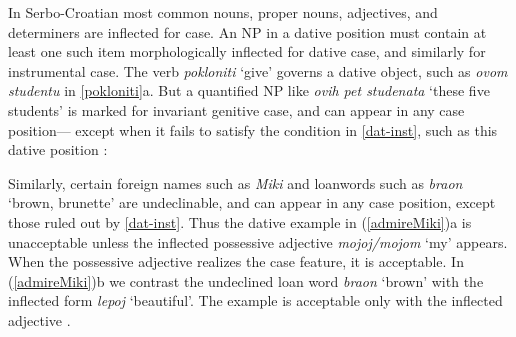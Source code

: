 In Serbo-Croatian most common nouns, proper nouns, adjectives, and determiners are inflected for case.  An NP in a dative position must contain at least one such item morphologically inflected for dative case, and similarly for instrumental case.  The verb {\it pokloniti} `give' governs a dative object, such as \textit{ovom  studentu} in \ref{pokloniti}a.  But a quantified NP like \textit{ovih pet studenata} `these five students' is marked for invariant genitive case, and can appear in any case position--- except when it fails to satisfy the condition in \ref{dat-inst}, such as this dative position \citep[p. 125]{WZ2003a}:

\begin{exe} 
\ex	\label{pokloniti}
\begin{xlist}
\end{xlist}
\end{exe}

\noindent
Similarly, certain foreign names such as \textit{Miki} and loanwords such as {\it braon} `brown, brunette' are undeclinable, and can appear in any case position, except those ruled out by \ref{dat-inst}.  Thus the
dative example in (\ref{admireMiki})a is unacceptable unless the inflected possessive
adjective {\it mojoj/mojom} `my'  appears.   When the possessive adjective realizes the case
feature, it is acceptable.  In  (\ref{admireMiki})b we contrast the undeclined loan word {\it
braon} `brown' with the inflected form {\it lepoj} `beautiful'.  The example is acceptable only
with the inflected adjective \citep[p. 134]{WZ2003a}.


\begin{exe} 
\ex	\label{admireMiki}
\begin{xlist}
\end{xlist}
\end{exe}

